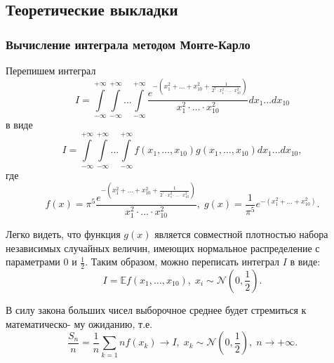 \documentclass[11pt]{article}
\newcommand\abs[1]{\left\lvert#1\right\rvert}
\begin{document}
\subsection{Теоретические выкладки}
\subsubsection{Вычисление интеграла методом Монте-Карло}
Перепишем интеграл
$$
I = \int\limits_{-\infty}^{+\infty} \int\limits_{-\infty}^{+\infty} \ldots \int\limits_{-\infty}^{+\infty} \frac{e^{-\left( x_1^2 + \ldots + x_{10}^2 + \frac{1}{2^7 \cdot x_1^2 \cdot \ldots \cdot x_{10}^2} \right) }}{x_1^2 \cdot \ldots \cdot x_{10}^2} dx_1 \ldots dx_{10}
$$
в виде
$$
I = \int\limits_{-\infty}^{+\infty} \int\limits_{-\infty}^{+\infty} \ldots \int\limits_{-\infty}^{+\infty} f(x_1, \ldots, x_{10}) g(x_1, \ldots, x_{10}) dx_1 \ldots dx_{10},
$$
где
$$
f(x) = \pi^5 \frac{e^{-\left( x_1^2 + \ldots + x_{10}^2 + \frac{1}{2^7 \cdot x_1^2 \cdot \ldots \cdot x_{10}^2} \right) }}{x_1^2 \cdot \ldots \cdot x_{10}^2}, \; g(x) = \frac{1}{\pi^5} e^{-\left( x_1^2 + \ldots + x_{10}^2 \right)}.
$$

Легко видеть, что функция $g(x)$ является совместной плотностью набора независимых случайных величин, имеющих нормальное распределение с параметрами $0$ и $\tfrac{1}{2}$. Таким образом, можно переписать интеграл $I$ в виде:
$$
I = \mathbb{E}f(x_1, \ldots, x_{10}), \; x_i \sim \mathcal{N}\left( 0, \frac{1}{2} \right).
$$

В силу закона больших чисел выборочное среднее будет стремиться к математическо-
му ожиданию, т.е.
$$
\frac{S_n}{n} = \frac{1}{n} \sum\limits_{k=1} n f(x_k) \rightarrow I, \; x_k \sim \mathcal{N}\left( 0, \frac{1}{2} \right), \; n \rightarrow +\infty.
$$

\end{document}

